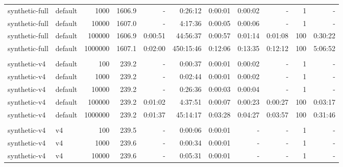 \begin{table}[hb]
\begin{center}
\begin{tabular}{llrr|rrrrr|rr}
synthetic-full  & default  &    1000 & 1606.9 &         - &   0:26:12 &   0:00:01 &   0:00:02 &         - &   1 &         - \\%
synthetic-full  & default  &   10000 & 1607.0 &         - &   4:17:36 &   0:00:05 &   0:00:06 &         - &   1 &         - \\%
synthetic-full  & default  &  100000 & 1606.9 &   0:00:51 &  44:56:37 &   0:00:57 &   0:01:14 &   0:01:08 & 100 &   0:30:22 \\%
synthetic-full  & default  & 1000000 & 1607.1 &   0:02:00 & 450:15:46 &   0:12:06 &   0:13:35 &   0:12:12 & 100 &   5:06:52 \\%
& & & & & & & & & \\
synthetic-v4    & default  &     100 &  239.2 &         - &   0:00:37 &   0:00:01 &   0:00:02 &         - &   1 &         - \\%
synthetic-v4    & default  &    1000 &  239.2 &         - &   0:02:44 &   0:00:01 &   0:00:02 &         - &   1 &         - \\%
synthetic-v4    & default  &   10000 &  239.2 &         - &   0:26:36 &   0:00:03 &   0:00:04 &         - &   1 &         - \\%
synthetic-v4    & default  &  100000 &  239.2 &   0:01:02 &   4:37:51 &   0:00:07 &   0:00:23 &   0:00:27 & 100 &   0:03:17 \\%
synthetic-v4    & default  & 1000000 &  239.2 &   0:01:37 &  45:14:17 &   0:03:28 &   0:04:27 &   0:03:57 & 100 &   0:31:46 \\%
& & & & & & & & & \\
synthetic-v4    & v4       &     100 &  239.5 &         - &   0:00:06 &   0:00:01 &         - &         - &   1 &         - \\%
synthetic-v4    & v4       &    1000 &  239.6 &         - &   0:00:34 &   0:00:01 &         - &         - &   1 &         - \\%
synthetic-v4    & v4       &   10000 &  239.6 &         - &   0:05:31 &   0:00:01 &         - &         - &   1 &         - \\%

\end{tabular}
\end{center}
\end{table}
